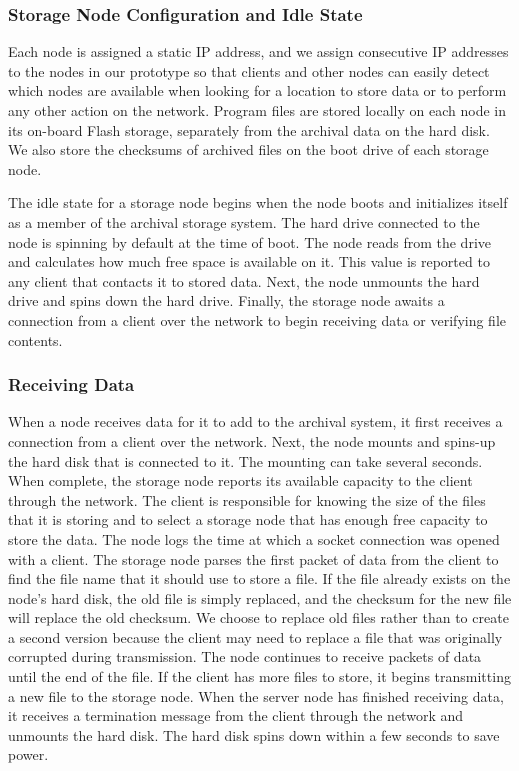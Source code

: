 \subsubsection{Storage Node Configuration and Idle State}
Each node is assigned a static IP address, and we assign consecutive IP addresses to the nodes in our prototype so that clients and other nodes can easily detect which nodes are available when looking for a location to store data or to perform any other action on the network.  Program files are stored locally on each node in its on-board Flash storage, separately from the archival data on the hard disk.  We also store the checksums of archived files on the boot drive of each storage node.

The idle state for a storage node begins when the node boots and initializes itself as a member of the archival storage system.  The hard drive connected to the node is spinning by default at the time of boot.  The node reads from the drive and calculates how much free space is available on it.  This value is reported to any client that contacts it to stored data.  Next, the node unmounts the hard drive and spins down the hard drive.  Finally, the storage node awaits a connection from a client over the network to begin receiving data or verifying file contents.

\subsubsection{Receiving Data}
When a node receives data for it to add to the archival system, it first receives a connection from a client over the network.  Next, the node mounts and spins-up the hard disk that is connected to it.  The mounting can take several seconds.  When complete, the storage node reports its available capacity to the client through the network.  The client is responsible for knowing the size of the files that it is storing and to select a storage node that has enough free capacity to store the data.  The node logs the time at which a socket connection was opened with a client.  The storage node parses the first packet of data from the client to find the file name that it should use to store a file.  If the file already exists on the node's hard disk, the old file is simply replaced, and the checksum for the new file will replace the old checksum.  We choose to replace old files rather than to create a second version because the client may need to replace a file that was originally corrupted during transmission.  The node continues to receive packets of data until the end of the file.  If the client has more files to store, it begins transmitting a new file to the storage node.  When the server node has finished receiving data, it receives a termination message from the client through the network and unmounts the hard disk.  The hard disk spins down within a few seconds to save power.

